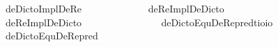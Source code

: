 \begin{isabellebody}
\ \ \ {\isachardoublequoteopen}deDictoImplDeRe\ {\isasymtau}\ {\isasymequiv}\ \isactrlbold {\isasymforall}{\isasymalpha}{\isachardot}\ \isactrlbold {\isasymbox}{\isacharparenleft}{\isacharparenleft}{\isasymlambda}{\isasymbeta}{\isachardot}\ {\isacharparenleft}{\isasymalpha}\ {\isasymbeta}{\isacharparenright}{\isacharparenright}\ \isactrlbold {\isasymdownharpoonleft}{\isasymtau}{\isacharparenright}\ \isactrlbold {\isasymrightarrow}\ {\isacharparenleft}{\isacharparenleft}{\isasymlambda}{\isasymbeta}{\isachardot}\ \isactrlbold {\isasymbox}{\isacharparenleft}{\isasymalpha}\ {\isasymbeta}{\isacharparenright}{\isacharparenright}\ \isactrlbold {\isasymdownharpoonleft}{\isasymtau}{\isacharparenright}{\isachardoublequoteclose}\isanewline
{}\isamarkupfalse%
\ deReImplDeDicto{\isacharcolon}{\isacharcolon}{\isachardoublequoteopen}{\isasymup}{\isasymlangle}{\isasymup}{\isasymzero}{\isasymrangle}{\isachardoublequoteclose}\ \isanewline
\ \ \ {\isachardoublequoteopen}deReImplDeDicto\ {\isasymtau}\ {\isasymequiv}\ \isactrlbold {\isasymforall}{\isasymalpha}{\isachardot}\ {\isacharparenleft}{\isacharparenleft}{\isasymlambda}{\isasymbeta}{\isachardot}\ \isactrlbold {\isasymbox}{\isacharparenleft}{\isasymalpha}\ {\isasymbeta}{\isacharparenright}{\isacharparenright}\ \isactrlbold {\isasymdownharpoonleft}{\isasymtau}{\isacharparenright}\ \isactrlbold {\isasymrightarrow}\ \isactrlbold {\isasymbox}{\isacharparenleft}{\isacharparenleft}{\isasymlambda}{\isasymbeta}{\isachardot}\ {\isacharparenleft}{\isasymalpha}\ {\isasymbeta}{\isacharparenright}{\isacharparenright}\ \isactrlbold {\isasymdownharpoonleft}{\isasymtau}{\isacharparenright}{\isachardoublequoteclose}\isanewline
\ \ \isanewline
{}\isamarkupfalse%
\ deDictoEquDeRe{\isacharunderscore}pred{\isacharcolon}{\isacharcolon}{\isachardoublequoteopen}{\isacharparenleft}{\isacharprime}t{\isasymRightarrow}io{\isacharparenright}{\isasymRightarrow}io{\isachardoublequoteclose}\ \isanewline
\ \ \ {\isachardoublequoteopen}deDictoEquDeRe{\isacharunderscore}pred\ {\isasymtau}\ {\isasymequiv}\ \isactrlbold {\isasymforall}{\isasymalpha}{\isachardot}\ {\isacharparenleft}{\isacharparenleft}{\isasymlambda}{\isasymbeta}{\isachardot}\ \isactrlbold {\isasymbox}{\isacharparenleft}{\isasymalpha}\ {\isasymbeta}{\isacharparenright}{\isacharparenright}\ \isactrlbold {\isasymdown}{\isasymtau}{\isacharparenright}\ \isactrlbold {\isasymleftrightarrow}\ \isactrlbold {\isasymbox}{\isacharparenleft}{\isacharparenleft}{\isasymlambda}{\isasymbeta}{\isachardot}\ {\isacharparenleft}{\isasymalpha}\ {\isasymbeta}{\isacharparenright}{\isacharparenright}\ \isactrlbold {\isasymdown}{\isasymtau}{\isacharparenright}{\isachardoublequoteclose}\isanewline

\end{isabellebody}
